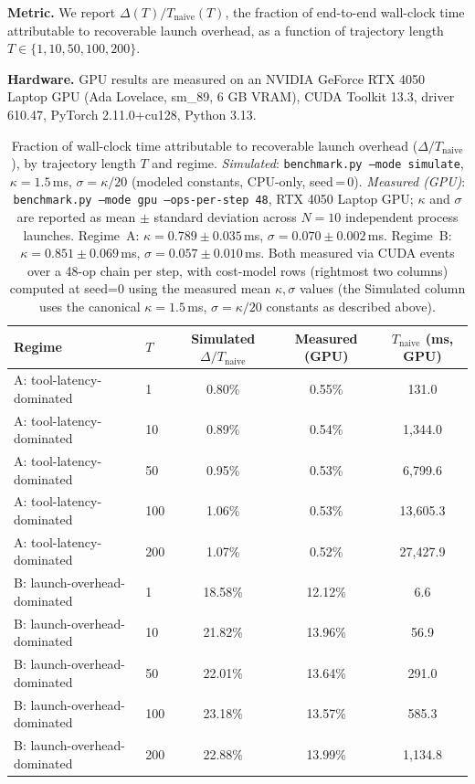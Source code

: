 \documentclass{article}
\begin{document}
\textbf{Metric.} We report $\Delta(T)/T_{\text{naive}}(T)$, the
fraction of end-to-end wall-clock time attributable to recoverable
launch overhead, as a function of trajectory length $T \in
\{1,10,50,100,200\}$.

\textbf{Hardware.} GPU results are measured on an NVIDIA GeForce RTX 4050
Laptop GPU (Ada Lovelace, sm\_89, 6 GB VRAM), CUDA Toolkit 13.3,
driver 610.47, PyTorch 2.11.0+cu128, Python 3.13.

\begin{table}[t]
\centering
\caption{Fraction of wall-clock time attributable to recoverable launch
overhead ($\Delta/T_{\text{naive}}$), by trajectory length $T$ and
regime. \emph{Simulated}: \texttt{benchmark.py --mode simulate},
$\kappa=1.5$\,ms, $\sigma=\kappa/20$ (modeled constants, CPU-only,
seed\,=\,0). \emph{Measured (GPU)}: \texttt{benchmark.py --mode gpu
--ops-per-step 48}, RTX 4050 Laptop GPU; $\kappa$ and $\sigma$
are reported as mean $\pm$ standard deviation across $N=10$
independent process launches. Regime~A: $\kappa=0.789\pm0.035$\,ms,
$\sigma=0.070\pm0.002$\,ms. Regime~B: $\kappa=0.851\pm0.069$\,ms,
$\sigma=0.057\pm0.010$\,ms. Both measured via CUDA events over a
48-op chain per step, with cost-model rows (rightmost two columns)
computed at seed=0 using the measured mean $\kappa,\sigma$ values
(the Simulated column uses the canonical $\kappa=1.5$\,ms,
$\sigma=\kappa/20$ constants as described above).}
\label{tab:results}
\begin{tabular}{llccc}
\toprule
Regime & $T$ & Simulated $\Delta/T_{\text{naive}}$ & Measured (GPU) & $T_{\text{naive}}$ (ms, GPU) \\
\midrule
A: tool-latency-dominated    & 1   & 0.80\%  & 0.55\%  & 131.0 \\
A: tool-latency-dominated    & 10  & 0.89\%  & 0.54\%  & 1{,}344.0 \\
A: tool-latency-dominated    & 50  & 0.95\%  & 0.53\%  & 6{,}799.6 \\
A: tool-latency-dominated    & 100 & 1.06\%  & 0.53\%  & 13{,}605.3 \\
A: tool-latency-dominated    & 200 & 1.07\%  & 0.52\%  & 27{,}427.9 \\
\midrule
B: launch-overhead-dominated & 1   & 18.58\% & 12.12\% & 6.6 \\
B: launch-overhead-dominated & 10  & 21.82\% & 13.96\% & 56.9 \\
B: launch-overhead-dominated & 50  & 22.01\% & 13.64\% & 291.0 \\
B: launch-overhead-dominated & 100 & 23.18\% & 13.57\% & 585.3 \\
B: launch-overhead-dominated & 200 & 22.88\% & 13.99\% & 1{,}134.8 \\
\bottomrule
\end{tabular}
\end{table}
\end{document}

